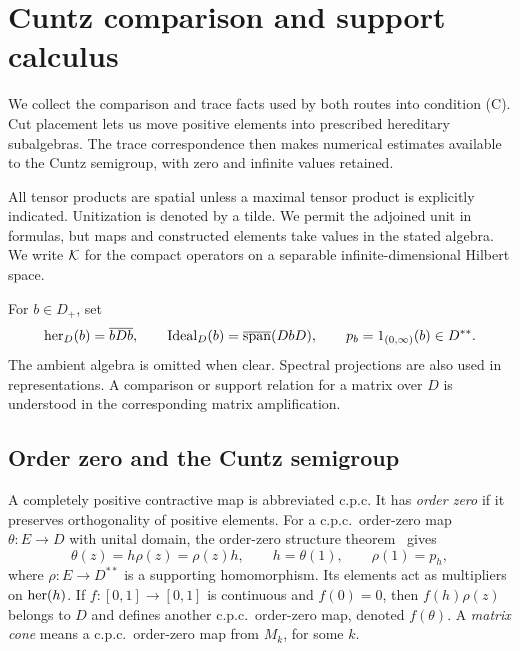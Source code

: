 \section{Cuntz comparison and support calculus}
\label{sec:preliminaries}

We collect the comparison and trace facts used by both routes into
condition (C). Cut placement lets us move positive elements into prescribed
hereditary subalgebras. The trace correspondence then makes numerical
estimates available to the Cuntz semigroup, with zero and infinite values
retained.

All tensor products are spatial unless a maximal tensor product is
explicitly indicated. Unitization is denoted by a tilde. We permit the
adjoined unit in formulas, but maps and constructed elements take
values in the stated algebra.
We write \(\mathcal K\) for the compact operators on a separable
infinite-dimensional Hilbert space.

For \(b\in D_+\), set
\[
 \operatorname{her}_D(b)=\overline{bDb},\qquad
 \operatorname{Ideal}_D(b)=\overline{\operatorname{span}}(DbD),\qquad
 p_b=1_{(0,\infty)}(b)\in D^{**}.
\]
The ambient algebra is omitted when clear. Spectral projections are
also used in representations. A comparison or support relation for a
matrix over \(D\) is understood in the corresponding matrix
amplification.

\subsection{Order zero and the Cuntz semigroup}

A completely positive contractive map is abbreviated c.p.c. It has
\emph{order zero} if it preserves orthogonality of positive elements.
For a c.p.c.\ order-zero map \(\theta:E\to D\) with unital domain, the
order-zero structure theorem~\cite{WZ2009} gives
\[
 \theta(z)=h\rho(z)=\rho(z)h,\qquad
 h=\theta(1),\qquad \rho(1)=p_h,
\]
where \(\rho:E\to D^{**}\) is a supporting homomorphism. Its elements
act as multipliers on \(\operatorname{her}(h)\). If \(f:[0,1]\to[0,1]\) is continuous
and \(f(0)=0\), then \(f(h)\rho(z)\) belongs to \(D\) and defines another
c.p.c.\ order-zero map, denoted \(f(\theta)\). A \emph{matrix cone}
means a c.p.c.\ order-zero map from \(M_k\), for some \(k\).

